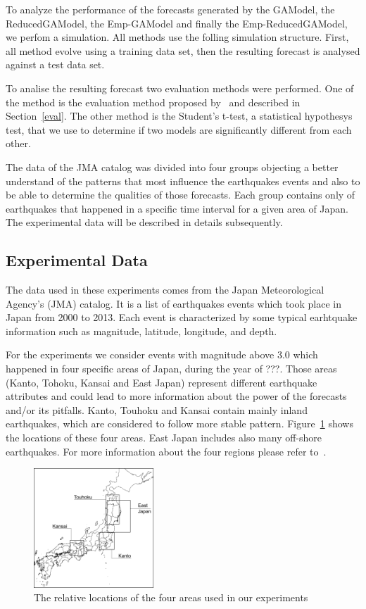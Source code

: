 To analyze the performance of the forecasts generated by the GAModel,
the ReducedGAModel, the Emp-GAModel and finally the
Emp-ReducedGAModel, we perfom a simulation. All methods use the folling 
simulation structure. First, all method evolve using a training data set,
then the resulting forecast is analysed against a test data set.

To analise the resulting forecast two evaluation methods were performed.
 One of the method is the evaluation method proposed by~\cite{schorlemmer2007earthquake}
 and described in Section~\ref{eval}. The other method is the Student's t-test, a statistical hypothesys test, that we use to determine if two models are significantly different from each other.

The data of the JMA catalog was divided into four
groups objecting a better understand of the patterns that most influence the
earthquakes events and also to be able to determine the qualities of
those forecasts. Each group contains only of earthquakes that happened in a
specific time interval for a given area of Japan. The experimental
data will be described in details subsequently.

\subsection{Experimental Data}
The data used in these experiments comes from the Japan Meteorological
Agency's (JMA) catalog. It is a list of earthquakes events which took
place in Japan from 2000 to 2013. Each event is characterized by some
typical earhtquake information such as magnitude, latitude, longitude,
and depth.

For the experiments we consider events with magnitude above 3.0 which
happened in four specific areas of Japan, during the year of
???. Those areas (Kanto, Tohoku, Kansai and East Japan) represent
different earthquake attributes and could lead to more information
about the power of the forecasts and/or its pitfalls. Kanto, Touhoku
and Kansai contain mainly inland earthquakes, which are considered to
follow more stable pattern. Figure~\ref{areamap} shows the locations of these four areas. East Japan includes also many off-shore earthquakes. For more information about the four regions please refer to~\cite{ecta14}.

\begin{figure}
  \begin{center}
  \includegraphics[width=0.40\textwidth]{img/alljapan.png}
  \end{center}
  \caption{The relative locations of the four areas used in our
    experiments}
  \label{areamap}
\end{figure}

